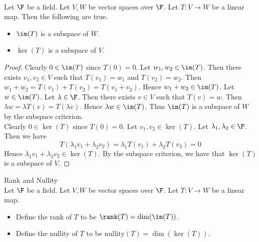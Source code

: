 \documentclass[a4paper]{article}
\begin{document}
\begin{prp}{}{}\\
Let $\F$ be a field. Let $V,W$ be vector spaces over $\F$. Let $T:V\to W$ be a linear map. Then the following are true. 
\begin{itemize}
\item $\im(T)$ is a subspace of $W$. 
\item $\ker(T)$ is a subspace of $V$. 
\end{itemize}
\begin{proof}
Clearly $0\in\im(T)$ since $T(0)=0$. Let $w_1,w_2\in\im(T)$. Then there exists $v_1,v_2\in V$ such that $T(v_1)=w_1$ and $T(v_2)=w_2$. Then $w_1+w_2=T(v_1)+T(v_2)=T(v_1+v_2)$. Hence $w_1+w_2\in\im(T)$. Let $w\in\im(T)$. Let $\lambda\in\F$. Then there exists $v\in V$ such that $T(v)=w$. Then $\lambda w=\lambda T(v)=T(\lambda v)$. Hence $\lambda w\in\im(T)$. Thus $\im(T)$ is a subspace of $W$ by the subspace criterion. \\

Clearly $0\in\ker(T)$ since $T(0)=0$. Let $v_1,v_2\in\ker(T)$. Let $\lambda_1,\lambda_2\in\F$. Then we have $$T(\lambda_1v_1+\lambda_2v_2)=\lambda_1T(v_1)+\lambda_2T(v_2)=0$$ Hence $\lambda_1v_1+\lambda_2v_2\in\ker(T)$. By the subspace criterion, we have that $\ker(T)$ is a subspace of $V$. 
\end{proof}
\end{prp}

\begin{defn}{Rank and Nullity}{}\\
Let $\F$ be a field. Let $V,W$ be vector spaces over $\F$. Let $T:V\to W$ be a linear map. 
\begin{itemize}
\item Define the rank of $T$ to be $\rank(T)=\dim(\im(T))$. 
\item Define the nullity of $T$ to be $\text{nullity}(T)=\dim(\ker(T))$. 
\end{itemize}
\end{defn}
\end{document}

